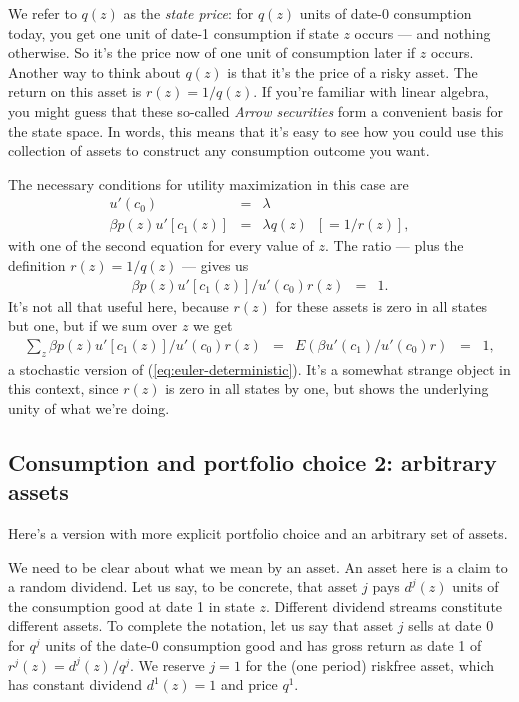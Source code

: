\documentclass[11pt]{article}
\begin{document}
We refer to $q(z)$ as the {\it state price\/}:
for $q(z)$ units of date-0 consumption today, you get one
unit of date-1 consumption if state $z$ occurs --- and nothing otherwise.
So it's the price now of one unit of consumption later if $z$ occurs.
Another way to think about $q(z)$ is that it's the price of a risky asset.
The return on this asset is $r(z) = 1/q(z)$.
If you're familiar with linear algebra,
you might guess that these so-called {\it Arrow securities\/}
form a convenient basis for the state space.
In words, this means that it's easy to see how you could
use this collection of assets to construct any consumption outcome you want.


The necessary conditions for utility maximization in this case are
\begin{eqnarray*}
    u'(c_0)  &=& \lambda  \\
       \beta p(z) u'[c_1(z)]  &=& \lambda q(z) \;\; [= 1/r(z)],
\end{eqnarray*}
with one of the second equation for every value of $z$.
The ratio --- plus the definition $ r(z) = 1/q(z)$ ---
gives us
\begin{eqnarray*}
       \beta p(z) u'[c_1(z)] / u'(c_0) r(z)  &=& 1 .
\end{eqnarray*}
It's not all that useful here,
because $r(z)$ for these assets is zero in all states but one,
but if we sum over $z$ we get
\begin{eqnarray*}
     \sum_z  \beta p(z) u'[c_1(z)] / u'(c_0) r(z)  &=&
     E \left( \beta u'(c_1) / u'(c_0) r \right)
     \;\;=\;\; 1 ,
     \label{eq:euler-stochastic}
\end{eqnarray*}
a stochastic version of (\ref{eq:euler-deterministic}).
It's a somewhat strange object in this context,
since $r(z)$ is zero in all states by one,
but shows the underlying unity of what we're doing.


\subsection*{Consumption and portfolio choice 2:  arbitrary assets}

Here's a version with more explicit portfolio choice
and an arbitrary set of assets.

We need to be clear about what we mean by an asset.
An asset here is a claim to a random dividend.
Let us say, to be concrete, that asset $j$ pays $d^j(z)$ units
of the consumption good at date 1 in state $z$.
Different dividend streams constitute different assets.
To complete the notation,
let us say that asset $j$ sells at date 0
for $q^j$ units of the date-0 consumption good
and has gross return as date 1 of $r^j(z) = d^j(z)/q^j$.
We reserve $j=1$ for the (one period) riskfree asset,
which has constant dividend $d^1(z) = 1$ and price $q^1$.
\end{document}
